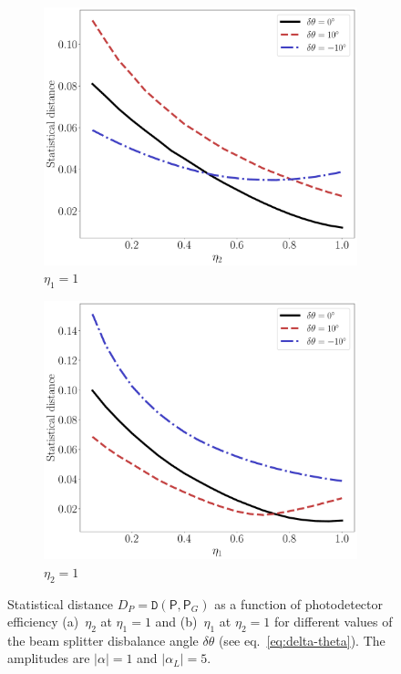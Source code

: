 \documentclass[%
reprint,
superscriptaddress,
 amsmath,amssymb,amsfonts,
 aps,
 pra,
 longbibliography
]{revtex4-2}
\newcommand{\prob}{\mathsf{P}}
\begin{document}
\begin{figure}
    \centering
    \begin{subfigure}[]{.45\linewidth}
\includegraphics[width=\linewidth]{pics/homodyne/ed(eta2).pdf}
\caption[]{$\eta_1=1$}
\label{fig:eta1-1}
        \end{subfigure}
\begin{subfigure}[]{.45\linewidth}
 \includegraphics[width=\linewidth]{pics/homodyne/ed(eta1).pdf}
 \caption[]{$\eta_2=1$}
 \label{fig:eta2-1}
\end{subfigure}
\caption{Statistical distance $D_P=\mathtt{D}(\prob,\prob_G)$
  as a function of  photodetector efficiency
  (a)~$\eta_2$ at $\eta_1=1$ and
  (b)~$\eta_1$ at $\eta_2=1$
  for different values of the beam splitter disbalance angle
  $\delta\theta$ (see eq.~\eqref{eq:delta-theta}).
  The amplitudes are
  $|\alpha|=1$ and $|\alpha_L|=5$.
}
\label{fig:delta-eta}
\end{figure}
\end{document}
